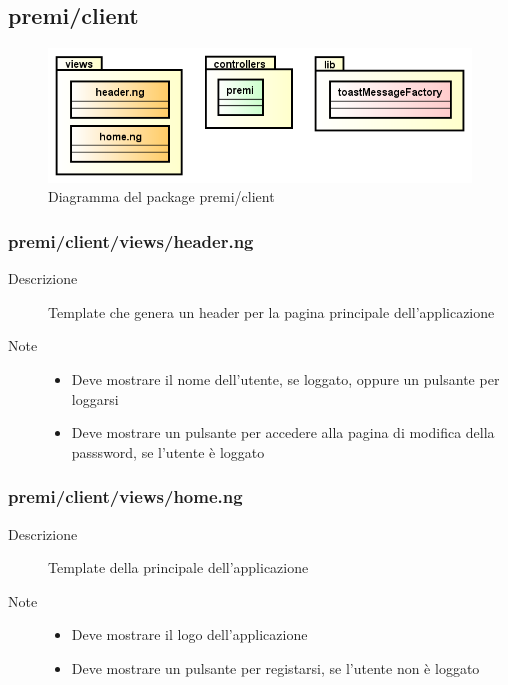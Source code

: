 \clearpage
\subsection{premi/client}
\begin{figure}[H]
\begin{center}
\includegraphics[scale=0.50]{img/diapkg/client.png}
\caption{Diagramma del package premi/client}
\end{center}
\end{figure}


\subsubsection{premi/client/views/header.ng}

\begin{description}
\item[Descrizione] \hfill
	Template che genera un header per la pagina principale dell'applicazione
	\item[Note] \hfill
	\begin{itemize}
			\item Deve mostrare il nome dell'utente, se loggato, oppure un pulsante per loggarsi
			\item Deve mostrare un pulsante per accedere alla pagina di modifica della passsword, se l'utente è loggato
	\end{itemize}
\end{description}

\subsubsection{premi/client/views/home.ng}

\begin{description}
\item[Descrizione] \hfill
	Template della principale dell'applicazione
	\item[Note] \hfill
	\begin{itemize}
			\item Deve mostrare il logo dell'applicazione
			\item Deve mostrare un pulsante per registarsi, se l'utente non è loggato
	\end{itemize}
\end{description}

